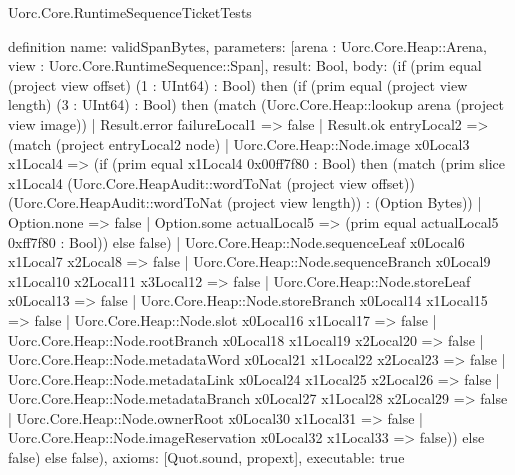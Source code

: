 \begin{lexlean}{Uorc.Core.RuntimeSequenceTicketTests}
\begin{semanticmodule}
definition{
  name: validSpanBytes,
  parameters: [arena : Uorc.Core.Heap::Arena, view : Uorc.Core.RuntimeSequence::Span],
  result: Bool,
  body: (if (prim equal (project view offset) (1 : UInt64) : Bool) then (if (prim equal (project view length) (3 : UInt64) : Bool) then (match (Uorc.Core.Heap::lookup arena (project view image))
    | Result.error failureLocal1 => false
    | Result.ok entryLocal2 => (match (project entryLocal2 node)
      | Uorc.Core.Heap::Node.image x0Local3 x1Local4 => (if (prim equal x1Local4 0x00ff7f80 : Bool) then (match (prim slice x1Local4 (Uorc.Core.HeapAudit::wordToNat (project view offset)) (Uorc.Core.HeapAudit::wordToNat (project view length)) : (Option Bytes))
        | Option.none => false
        | Option.some actualLocal5 => (prim equal actualLocal5 0xff7f80 : Bool)) else false)
      | Uorc.Core.Heap::Node.sequenceLeaf x0Local6 x1Local7 x2Local8 => false
      | Uorc.Core.Heap::Node.sequenceBranch x0Local9 x1Local10 x2Local11 x3Local12 => false
      | Uorc.Core.Heap::Node.storeLeaf x0Local13 => false
      | Uorc.Core.Heap::Node.storeBranch x0Local14 x1Local15 => false
      | Uorc.Core.Heap::Node.slot x0Local16 x1Local17 => false
      | Uorc.Core.Heap::Node.rootBranch x0Local18 x1Local19 x2Local20 => false
      | Uorc.Core.Heap::Node.metadataWord x0Local21 x1Local22 x2Local23 => false
      | Uorc.Core.Heap::Node.metadataLink x0Local24 x1Local25 x2Local26 => false
      | Uorc.Core.Heap::Node.metadataBranch x0Local27 x1Local28 x2Local29 => false
      | Uorc.Core.Heap::Node.ownerRoot x0Local30 x1Local31 => false
      | Uorc.Core.Heap::Node.imageReservation x0Local32 x1Local33 => false)) else false) else false),
  axioms: [Quot.sound, propext],
  executable: true
}


\end{semanticmodule}
\end{lexlean}

